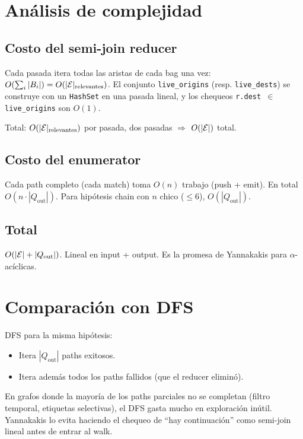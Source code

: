 \section{Análisis de complejidad}

\subsection{Costo del semi-join reducer}

Cada pasada itera todas las aristas de cada bag una vez:
\(O(\sum_i |B_i|) = O(|\mathcal{E}|_{\text{relevantes}})\). El conjunto
\texttt{live\_origins} (resp. \texttt{live\_dests}) se construye
con un \texttt{HashSet} en una pasada lineal, y los chequeos
\texttt{r.dest \(\in\) live\_origins} son \(O(1)\).

Total: \(O(|\mathcal{E}|_{\text{relevantes}})\) por pasada, dos pasadas
\(\Rightarrow\) \(O(|\mathcal{E}|)\) total.

\subsection{Costo del enumerator}

Cada path completo (cada match) toma \(O(n)\) trabajo (push +
emit). En total \(O(n \cdot |Q_{\text{out}}|)\). Para hipótesis
chain con \(n\) chico (\(\leq 6\)), \(O(|Q_{\text{out}}|)\).

\subsection{Total}

\(O(|\mathcal{E}| + |Q_{\text{out}}|)\). Lineal en input + output. Es la
promesa de Yannakakis para \(\alpha\)-acíclicas.

\section{Comparación con DFS}

DFS para la misma hipótesis:

\begin{itemize}
    \item Itera $|Q_{\text{out}}|$ paths exitosos.
    \item Itera además todos los paths fallidos (que el reducer
    eliminó).
\end{itemize}

\noindent
En grafos donde la mayoría de los paths parciales no se completan
(filtro temporal, etiquetas selectivas), el DFS gasta mucho en
exploración inútil. Yannakakis lo evita haciendo el chequeo de
``hay continuación'' como semi-join lineal antes de entrar al
walk.

